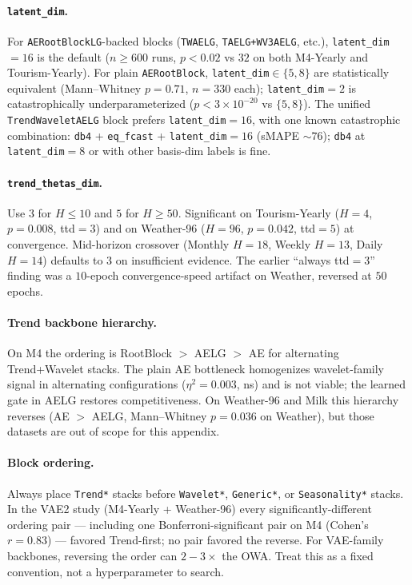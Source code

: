 \documentclass[11pt,a4paper]{article}
\begin{document}
\paragraph{\texttt{latent\_dim}.} For \texttt{AERootBlockLG}-backed blocks (\texttt{TWAELG}, \texttt{TAELG+WV3AELG}, etc.), \texttt{latent\_dim}$=16$ is the default ($n\geq 600$ runs, $p<0.02$ vs $32$ on both M4-Yearly and Tourism-Yearly). For plain \texttt{AERootBlock}, \texttt{latent\_dim}$\in\{5, 8\}$ are statistically equivalent (Mann--Whitney $p=0.71$, $n=330$ each); \texttt{latent\_dim}$=2$ is catastrophically underparameterized ($p<3\times 10^{-20}$ vs $\{5, 8\}$). The unified \texttt{TrendWaveletAELG} block prefers \texttt{latent\_dim}$=16$, with one known catastrophic combination: \texttt{db4} + \texttt{eq\_fcast} + \texttt{latent\_dim}$=16$ (sMAPE $\sim 76$); \texttt{db4} at \texttt{latent\_dim}$=8$ or with other basis-dim labels is fine.

\paragraph{\texttt{trend\_thetas\_dim}.} Use $3$ for $H \le 10$ and $5$ for $H \ge 50$. Significant on Tourism-Yearly ($H=4$, $p=0.008$, ttd$=3$) and on Weather-96 ($H=96$, $p=0.042$, ttd$=5$) at convergence. Mid-horizon crossover (Monthly $H=18$, Weekly $H=13$, Daily $H=14$) defaults to $3$ on insufficient evidence. The earlier ``always ttd$=3$'' finding was a $10$-epoch convergence-speed artifact on Weather, reversed at $50$ epochs.

\paragraph{Trend backbone hierarchy.} On M4 the ordering is RootBlock $>$ AELG $>$ AE for alternating Trend+Wavelet stacks. The plain AE bottleneck homogenizes wavelet-family signal in alternating configurations ($\eta^2 = 0.003$, ns) and is not viable; the learned gate in AELG restores competitiveness. On Weather-96 and Milk this hierarchy reverses (AE $>$ AELG, Mann--Whitney $p=0.036$ on Weather), but those datasets are out of scope for this appendix.

\paragraph{Block ordering.} Always place \texttt{Trend*} stacks before \texttt{Wavelet*}, \texttt{Generic*}, or \texttt{Seasonality*} stacks. In the VAE2 study (M4-Yearly + Weather-96) every significantly-different ordering pair --- including one Bonferroni-significant pair on M4 (Cohen's $r=0.83$) --- favored Trend-first; no pair favored the reverse. For VAE-family backbones, reversing the order can $2{-}3\times$ the OWA. Treat this as a fixed convention, not a hyperparameter to search.
\end{document}
